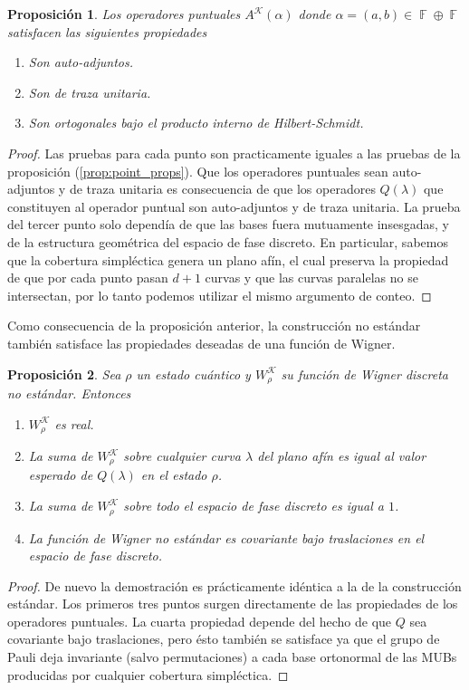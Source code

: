 \documentclass[a4paper]{report}
\DeclareMathOperator{\F}{\mathbb{F}}
\newtheorem{proposition}{Proposición}
\begin{document}
  \begin{proposition}
    Los operadores puntuales $A^{\mathcal K}(\alpha)$ donde
    $\alpha = (a,b) \in \F \oplus \F$ satisfacen las
    siguientes propiedades
    \begin{enumerate}
      \item Son auto-adjuntos.
      \item Son de traza unitaria.
      \item Son ortogonales bajo el producto interno de
        Hilbert-Schmidt.
    \end{enumerate}
  \end{proposition}
  \begin{proof}
    Las pruebas para cada punto son practicamente iguales a
    las pruebas de la proposición (\ref{prop:point_props}).
    Que los operadores puntuales sean auto-adjuntos y de
    traza unitaria es consecuencia de que los operadores
    $Q(\lambda)$ que constituyen al operador puntual son
    auto-adjuntos y de traza unitaria. La prueba del tercer
    punto solo dependía de que las bases fuera mutuamente
    insesgadas, y de la estructura geométrica del espacio de
    fase discreto. En particular, sabemos que la cobertura
    simpléctica genera un plano afín, el cual preserva la
    propiedad de que por cada punto pasan $d+1$ curvas y que
    las curvas paralelas no se intersectan, por lo tanto
    podemos utilizar el mismo argumento de conteo.
  \end{proof}
  Como consecuencia de la proposición anterior, la
  construcción no estándar también satisface las propiedades
  deseadas de una función de Wigner.
  \begin{proposition}
    Sea $\rho$ un estado cuántico y $W_\rho^{\mathcal K}$ su
    función de Wigner discreta no estándar. Entonces
    \begin{enumerate}
      \item $W_\rho^{\mathcal K}$ es real.
      \item La suma de $W_\rho^{\mathcal K}$ sobre cualquier
        curva $\lambda$ del plano afín es igual al valor
        esperado de $Q(\lambda)$ en el estado $\rho$.
      \item La suma de $W_\rho^{\mathcal K}$ sobre todo el
        espacio de fase discreto es igual a $1$.
      \item La función de Wigner no estándar es covariante
        bajo traslaciones en el espacio de fase discreto.
    \end{enumerate}
  \end{proposition}
  \begin{proof}
    De nuevo la demostración es prácticamente idéntica a la
    de la construcción estándar. Los primeros tres puntos
    surgen directamente de las propiedades de los operadores
    puntuales. La cuarta propiedad depende del hecho de que
    $Q$ sea covariante bajo traslaciones, pero ésto también
    se satisface ya que el grupo de Pauli deja invariante
    (salvo permutaciones) a cada base ortonormal de las MUBs
    producidas por cualquier cobertura simpléctica.
  \end{proof}
\end{document}
